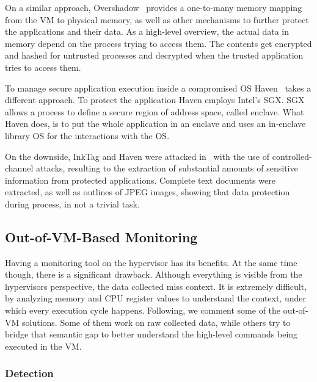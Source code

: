 \par On a similar approach, Overshadow~\cite{chen2008overshadow} provides a one-to-many memory mapping from the \ac{VM} to physical memory, as well as other mechanisms to further protect the applications and their data. As a high-level overview, the actual data in memory depend on the process trying to access them. The contents get encrypted and hashed for untrusted processes and decrypted when the trusted application tries to access them. 

\par To manage secure application execution inside a compromised \ac{OS} Haven~\cite{baumann2015shielding} takes a different approach. To protect the application Haven employs Intel's \ac{SGX}. \ac{SGX} allows a process to define a secure region of address space, called enclave. What Haven does, is to put the whole application in an enclave and uses an in-enclave library \ac{OS} for the interactions with the \ac{OS}.

\par On the downside, InkTag and Haven were attacked in~\cite{xu2015controlled} with the use of controlled-channel attacks, resulting to the extraction of substantial amounts of sensitive information from protected applications. Complete text documents were extracted, as well as outlines of JPEG images, showing that data protection during process, in not a trivial task. 


\subsection{Out-of-\ac{VM}-Based Monitoring}\label{sub:outvm}
Having a monitoring tool on the hypervisor has its benefits. At the same time though, there is a significant drawback. Although everything is visible from the hypervisors perspective, the data collected miss context. It is extremely difficult, by analyzing memory and \ac{CPU} register values to understand the context, under which every execution cycle happens. Following, we comment some of the out-of-\ac{VM} solutions. Some of them work on raw collected data, while others try to bridge that semantic gap to better understand the high-level commands being executed in the \ac{VM}.

\subsubsection{Detection}

